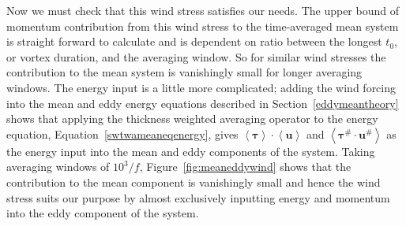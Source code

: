 \documentclass[12pt,a4paper]{report}
\newcommand*\nthkmean[1]{\left\langle{#1}\right\rangle}
\newcommand*\nthkres[1]{{#1}^{\#}}
\newcommand*\figref[1]{Figure~\ref{#1}}
\newcommand*\equref[1]{Equation~\eqref{#1}}
\newcommand*\secref[1]{Section~\ref{#1}}
\begin{document}
Now we must check that this wind stress satisfies our needs. 
The upper bound of momentum contribution from
this wind stress to the time-averaged mean system is straight forward to calculate
and is dependent on ratio between the longest $t_{0}$, or vortex duration, 
and the averaging window. So for similar wind stresses the contribution to the mean system
is vanishingly small for longer averaging windows. The energy input is a little more
complicated; adding the wind forcing into the mean and eddy energy equations described 
in \secref{eddymeantheory} 
shows that applying the thickness weighted averaging operator to 
the energy equation, \equref{swtwameaneqenergy}, gives
$\nthkmean{\boldsymbol{\tau}}\cdot\nthkmean{\boldsymbol{u}}$ and  $\nthkmean{\nthkres{\boldsymbol{\tau}}\cdot\nthkres{\boldsymbol{u}}}$
as the energy input into the mean and eddy components of the system.
Taking averaging windows of $10^{3}/f$, \figref{fig:meaneddywind} shows
that the contribution to the mean component is vanishingly small 
and hence the wind stress suits our purpose by almost exclusively 
inputting energy and momentum into the eddy component of the system.
\end{document}
